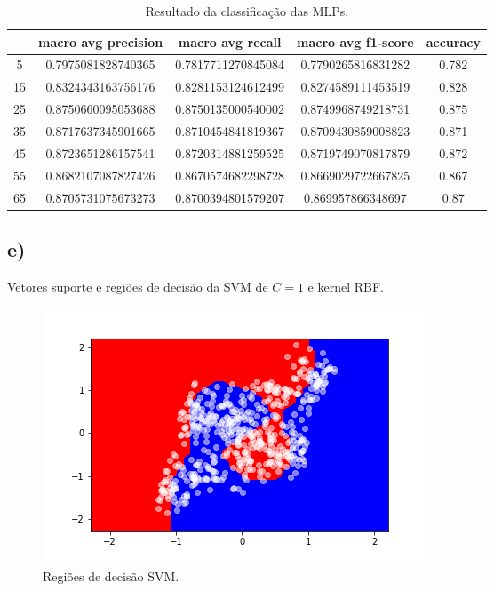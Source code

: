 \documentclass{article}
\begin{document}
    \begin{table}[H]
        \begin{tabular}{c|c|c|c|c|}
        \cline{2-5}
                                & \textbf{macro avg precision} & \textbf{macro avg recall} & \textbf{macro avg f1-score} & \textbf{accuracy} \\ \hline
        \multicolumn{1}{|c|}{5}  & 0.7975081828740365           & 0.7817711270845084        & 0.7790265816831282          & 0.782             \\ \hline
        \multicolumn{1}{|c|}{15} & 0.8324343163756176           & 0.8281153124612499        & 0.8274589111453519          & 0.828             \\ \hline
        \multicolumn{1}{|c|}{25} & 0.8750660095053688           & 0.8750135000540002        & 0.8749968749218731          & 0.875             \\ \hline
        \multicolumn{1}{|c|}{35} & 0.8717637345901665           & 0.8710454841819367        & 0.8709430859008823          & 0.871             \\ \hline
        \multicolumn{1}{|c|}{45} & 0.8723651286157541           & 0.8720314881259525        & 0.8719749070817879          & 0.872             \\ \hline
        \multicolumn{1}{|c|}{55} & 0.8682107087827426           & 0.8670574682298728        & 0.8669029722667825          & 0.867             \\ \hline
        \multicolumn{1}{|c|}{65} & 0.8705731075673273           & 0.8700394801579207        & 0.869957866348697           & 0.87              \\ \hline
        \end{tabular}
        \caption{Resultado da classificação das MLPs.}
        \label{tbl:mlp_multi}
    \end{table}
    
    \subsection*{e)}
    Vetores suporte e regiões de decisão da SVM de $C=1$ e kernel RBF. 
    \begin{figure}[H]
        \centering
        \includegraphics[width=\linewidth]{svm_decision.png}   
        \caption{Regiões de decisão SVM.}
        \label{fig:svm_decision}
    \end{figure}
\end{document}
